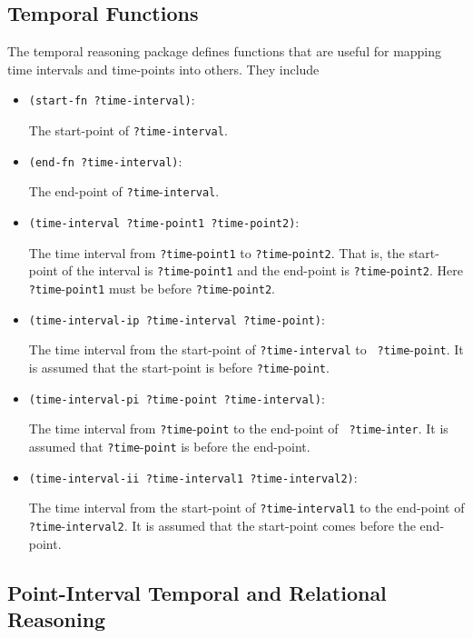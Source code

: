 \subsection{Temporal Functions}

The temporal reasoning package defines functions that are useful for
mapping time intervals and time-points into others.  They include

\begin{itemize}

 \item{\verb'(start-fn ?time-interval)':}

 The start-point of {\tt ?time-interval}.

 \item{\verb'(end-fn ?time-interval)':}

 The end-point of {\tt ?time}-{\tt interval}.

 \item{\verb'(time-interval ?time-point1 ?time-point2)':}

 The time interval from {\tt ?time}-{\tt point1} to {\tt ?time}-{\tt point2}.
 That is, the start-point of the interval is {\tt ?time}-{\tt point1} and the
 end-point is {\tt ?time}-{\tt point2}.  Here {\tt ?time}-{\tt point1} must
 be before {\tt ?time}-{\tt point2}.

 \item{\verb'(time-interval-ip ?time-interval ?time-point)':}

  The time interval from the start-point of {\tt ?time-interval} to {\tt
  ?time}-{\tt point}.  It is assumed that the start-point
  is before {\tt ?time}-{\tt point}.

 \item{\verb'(time-interval-pi ?time-point ?time-interval)':}

  The time interval from {\tt ?time}-{\tt point} to the end-point of {\tt
  ?time}-{\tt inter}.  It is assumed that {\tt ?time}-{\tt point} is
  before the end-point.


 \item{\verb'(time-interval-ii ?time-interval1 ?time-interval2)':}

 The time interval from the start-point of {\tt ?time}-{\tt interval1} to the
 end-point of {\tt ?time}-{\tt interval2}.  It is assumed that the start-point
 comes before the end-point.

\end{itemize}

\subsection{Point-Interval Temporal and Relational Reasoning}
\label{subsec-mixed-temporal-relational}

